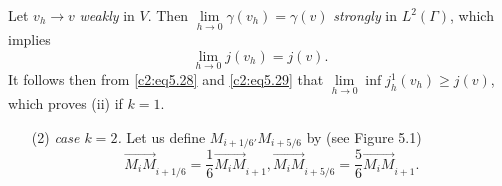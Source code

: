   Let $v_h \to v$ \textit{weakly} in $V$. Then $\lim\limits_{h \to 0}
  \gamma (v_h) = \gamma (v)$ \textit{strongly} in $L^2 (\Gamma)$,
  which implies  
\begin{equation}
\lim_{h \to 0} j(v_h) = j (v). \tag{5.29}\label{c2:eq5.29} 
\end{equation}  
It follows then from \eqref{c2:eq5.28} and \eqref{c2:eq5.29} that
$\lim\limits_{h \to 0} \inf j^1_h (v_h) \geq j (v)$, which proves (ii)
if $k=1$.   
\begin{enumerate}
\item[(2)] {\em case $k = 2$.} Let us define $M_{i + 1/6'} M_{i + 5/6}$
  by (see Figure 5.1) 
$$
\overrightarrow{M_i M}_{i +1 / 6} = \frac{1}{6} \overrightarrow{M_i
  M}_{i +1}, \overrightarrow{M_i M}_{i +5 / 6} = \frac{5}{6}
\overrightarrow{M_i M}_{i +1}. 
$$ 
\end{enumerate}

\setcounter{figure}{0}
\begin{figure}[H]
  \caption{}
\end{figure}

